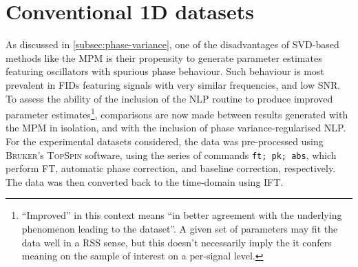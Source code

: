 \section{Conventional \ac{1D} datasets}
\label{sec:evaluation}

As discussed in \cref{subsec:phase-variance}, one of the disadvantages of
\ac{SVD}-based methods like the \ac{MPM} is their propensity to generate
parameter estimates featuring oscillators with spurious phase behaviour. Such
behaviour is most prevalent in \acp{FID} featuring signals with very similar
frequencies, and low \ac{SNR}. To assess the ability of the inclusion of the
\ac{NLP} routine to produce improved parameter estimates\footnote{
    ``Improved'' in this context means ``in better agreement with the
    underlying phenomenon leading to the dataset''. A given set of parameters
    may fit the data well in a \ac{RSS} sense, but this doesn't necessarily
    imply the it confers meaning on the sample of interest on a per-signal
    level.
}, comparisons are now made between results generated with the \ac{MPM} in
isolation, and with the inclusion of phase variance-regularised \ac{NLP}. For
the experimental datasets considered, the data was pre-processed using
\textsc{Bruker}'s \textsc{TopSpin} software, using the series of commands
\texttt{ft; pk; abs}, which perform \ac{FT}, automatic phase correction, and
baseline correction, respectively. The data was then converted back to the
time-domain using \ac{IFT}.

